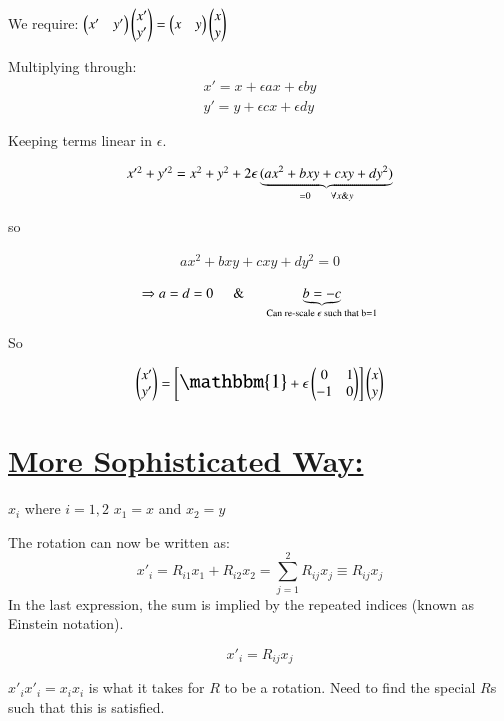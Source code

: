 {We require:
$\begin{pmatrix} x' & y' \end{pmatrix} \begin{pmatrix} x' \\ y' \end{pmatrix} = \begin{pmatrix} x & y \end{pmatrix} \begin{pmatrix} x \\ y \end{pmatrix} $ 

Multiplying through:
\begin{eqnarray*}
x' = x + \epsilon a x + \epsilon b y \\
y' = y + \epsilon  c x + \epsilon d y
\end{eqnarray*}


Keeping terms linear in $\epsilon$.

\begin{eqnarray*}
\textstyle
x'^2 + y'^2 = x^2 + y^2  + 2\epsilon\underbrace{(ax^2 + bxy + cxy + dy^2)}_{ =0 \hspace*{0.2in} \forall x \& y}
\end{eqnarray*}

so 

\begin{eqnarray*}
\textstyle
ax^2 + bxy + cxy + dy^2 = 0
\end{eqnarray*}

\begin{eqnarray*}
\textstyle
\Rightarrow a = d = 0  \hspace*{0.2in} \&   \hspace*{0.2in}  \underbrace{b=-c}_{\text{Can re-scale $\epsilon$ such that b=1}}
\end{eqnarray*}

So 

\begin{eqnarray*}
\xyprime = \left[ \mathlarger{\mathlarger{\mathbbm{1}}} + \epsilon   \IMatrix \right]\xy
\end{eqnarray*}

\section*{\underline{More Sophisticated Way:}}

$x_i$ where $i = 1,2$    $x_1 = x$ and $x_2 = y$

The rotation can now be written as:\\
\begin{equation*}
x'_i = R_{i1}x_1 + R_{i2}x_2 = \sum\limits_{j=1}^2 R_{ij} x_j \equiv R_{ij}x_j
\end{equation*}
In the last expression, the sum is implied by the repeated indices (known as Einstein notation).

\begin{equation*}
x'_i = R_{ij}x_j
\end{equation*}

$x'_i x'_i = x_i x_i$ is what it takes for $R$ to be a rotation. 
Need to find the special $R$s such that this is satisfied.

}
